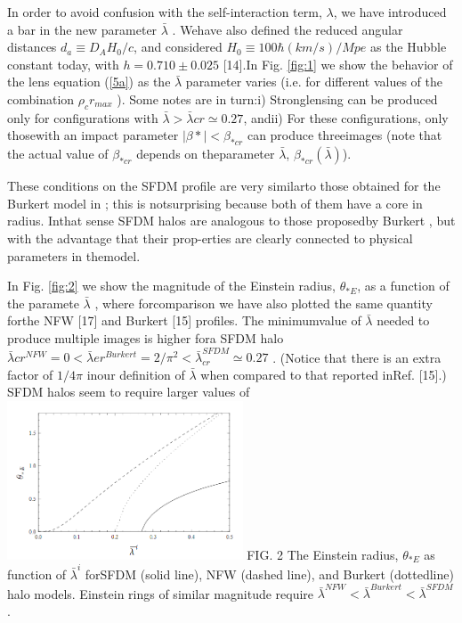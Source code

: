 \documentclass[10pt]{article}
\begin{document}
\begin{multicols}{2}
In order to avoid confusion with the self-interaction term, \(\lambda\), we have introduced a bar in the new parameter \(\bar{\lambda}\) .  Wehave  also  defined  the  reduced  angular  distances \(d_{a}\equiv D_{A}H_{0}/c\), and considered \(H_{0} \equiv 100 \hbar (km/s)/Mpe\) as the Hubble constant today, with \(h=0.710 \pm 0.025\) [14].In Fig. \ref{fig:1} we show the behavior of the lens equation (\ref{5a}) as the \(\bar{\lambda}\) parameter varies (i.e.  for different values of the combination \(\rho_{c} r_{max}\) ).  Some notes are in turn:i) Stronglensing can be produced only for configurations with \(\bar{\lambda} > \bar{\lambda}{cr}\simeq 0.27\), andii) For these configurations, only thosewith an impact parameter \(|\beta{*}|<\beta_{*cr}\) can produce threeimages (note that the actual value of \(\beta_{*cr}\) depends on theparameter \(\bar{\lambda}\), \(\beta_{*cr}(\bar{\lambda})\)). 

These conditions on the SFDM profile are very similarto those obtained for the Burkert model in \cite{Park_2003}; this is notsurprising because both of them have a core in radius.  Inthat sense SFDM halos are analogous to those proposedby Burkert \cite{Burkert_1995}, but with the advantage that their prop-erties are clearly connected to physical parameters in themodel.

In  Fig.  \ref{fig:2}  we  show  the  magnitude  of  the  Einstein  radius, \(\theta_{*E}\),  as  a  function  of  the  paramete \(\bar{\lambda}\) ,  where  forcomparison we have also plotted the same quantity forthe NFW [17] and Burkert [15] profiles.  The minimumvalue of \(\bar{\lambda}\) needed to produce multiple images is higher fora SFDM halo \(\bar{\lambda}{cr}^{NFW} = 0 < \bar{\lambda}{er}^{Burkert} = 2/\pi^{2} < \bar{\lambda}_{cr}^{SFDM} \simeq 0.27 \) .   (Notice  that  there  is  an  extra  factor  of \(1/4\pi\) inour  definition  of \(\bar{\lambda}\) when  compared  to  that  reported  inRef. [15].)  SFDM halos seem to require larger values of \\

\includegraphics[width=7cm]{fig2.png}\label{fig:2}
FIG. 2 The  Einstein  radius, \(\theta_{*E}\)  as  function  of \(\bar{\lambda}^{i}\) forSFDM (solid line), NFW (dashed line), and Burkert (dottedline) halo models.  Einstein rings of similar magnitude require \(\bar{\lambda}^{NFW}<\bar{\lambda}^{Burkert}<\bar{\lambda}^{SFDM}\). 
 

\end{multicols}
\end{document}
